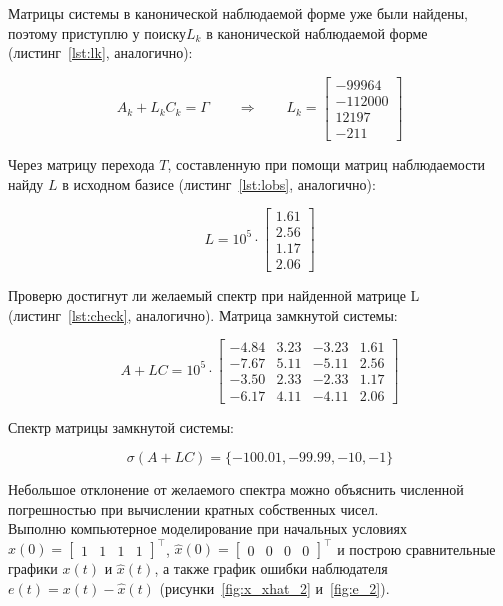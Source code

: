 \documentclass[a4paper,12pt]{article}
\begin{document}
Матрицы системы в канонической наблюдаемой форме уже были найдены, поэтому приступлю у поиску$L_k$ в канонической наблюдаемой форме (листинг~\ref{lst:lk}, аналогично):

\[
A_k + L_k C_k = \Gamma
\qquad \Longrightarrow \qquad
L_k =   \begin{bmatrix}
	-99964 \\ -112000 \\ 12197 \\ -211 
\end{bmatrix}
\]

Через матрицу перехода \(T\), составленную при помощи матриц наблюдаемости найду \(L\) в исходном базисе (листинг~\ref{lst:lobs}, аналогично):

\[
L = 10^5 \cdot \begin{bmatrix}
	1.61 \\
	2.56 \\
	1.17 \\
	2.06
\end{bmatrix}
\]

Проверю достигнут ли желаемый спектр при найденной матрице L (листинг~\ref{lst:check}, аналогично). Матрица замкнутой системы:

\[
A + LC = 10^5 \cdot
\begin{bmatrix}
	-4.84 &  3.23 & -3.23 &  1.61 \\
	-7.67 &  5.11 & -5.11 &  2.56 \\
	-3.50 &  2.33 & -2.33 &  1.17 \\
	-6.17 &  4.11 & -4.11 &  2.06
\end{bmatrix}
\]

Спектр матрицы замкнутой системы:

\[
\sigma(A + L C) = \{-100.01, -99.99, -10, -1\}
\]

Небольшое отклонение от желаемого спектра можно объяснить численной погрешностью при вычислении кратных собственных чисел. \\


Выполню компьютерное моделирование при начальных условиях
$x(0) = \begin{bmatrix} 1 & 1 & 1 & 1 \end{bmatrix}^\top$,
$\hat{x}(0) = \begin{bmatrix} 0 & 0 & 0 & 0 \end{bmatrix}^\top$
и построю сравнительные графики $x(t)$ и $\hat{x}(t)$,
а также график ошибки наблюдателя $e(t) = x(t) - \hat{x}(t)$
(рисунки~\ref{fig:x_xhat_2} и~\ref{fig:e_2}).
\end{document}
